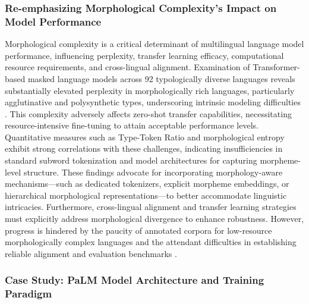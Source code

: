 \subsubsection{Re-emphasizing Morphological Complexity’s Impact on Model Performance}

Morphological complexity is a critical determinant of multilingual language model performance, influencing perplexity, transfer learning efficacy, computational resource requirements, and cross-lingual alignment. Examination of Transformer-based masked language models across 92 typologically diverse languages reveals substantially elevated perplexity in morphologically rich languages, particularly agglutinative and polysynthetic types, underscoring intrinsic modeling difficulties \cite{ref34}. This complexity adversely affects zero-shot transfer capabilities, necessitating resource-intensive fine-tuning to attain acceptable performance levels. Quantitative measures such as Type-Token Ratio and morphological entropy exhibit strong correlations with these challenges, indicating insufficiencies in standard subword tokenization and model architectures for capturing morpheme-level structure. These findings advocate for incorporating morphology-aware mechanisms---such as dedicated tokenizers, explicit morpheme embeddings, or hierarchical morphological representations---to better accommodate linguistic intricacies. Furthermore, cross-lingual alignment and transfer learning strategies must explicitly address morphological divergence to enhance robustness. However, progress is hindered by the paucity of annotated corpora for low-resource morphologically complex languages and the attendant difficulties in establishing reliable alignment and evaluation benchmarks \cite{ref34}.

\subsubsection{Case Study: PaLM Model Architecture and Training Paradigm}

